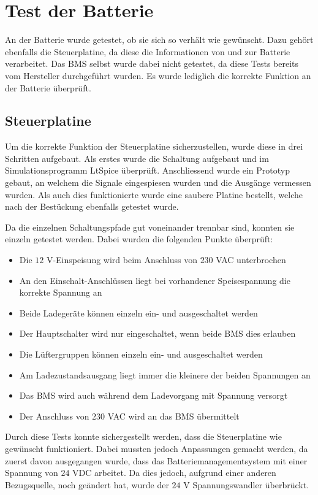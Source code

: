 \section{Test der Batterie}
An der Batterie wurde getestet, ob sie sich so verhält wie gewünscht. Dazu gehört ebenfalls die Steuerplatine, da diese die Informationen von und zur Batterie verarbeitet. Das BMS selbst wurde dabei nicht getestet, da diese Tests bereits vom Hersteller durchgeführt wurden. Es wurde lediglich die korrekte Funktion an der Batterie überprüft.

\subsection{Steuerplatine}
Um die korrekte Funktion der Steuerplatine sicherzustellen, wurde diese in drei Schritten aufgebaut. Als erstes wurde die Schaltung aufgebaut und im Simulationsprogramm LtSpice überprüft. Anschliessend wurde ein Prototyp gebaut, an welchem die Signale eingespiesen wurden und die Ausgänge vermessen wurden. Als auch dies funktionierte wurde eine saubere Platine bestellt, welche nach der Bestückung ebenfalls getestet wurde.

Da die einzelnen Schaltungspfade gut voneinander trennbar sind, konnten sie einzeln getestet werden. Dabei wurden die folgenden Punkte überprüft: \begin{itemize}
	\item Die $12$ V-Einspeisung wird beim Anschluss von $230$ VAC unterbrochen
	\item An den Einschalt-Anschlüssen liegt bei vorhandener Speisespannung die korrekte Spannung an
	\item Beide Ladegeräte können einzeln ein- und ausgeschaltet werden
	\item Der Hauptschalter wird nur eingeschaltet, wenn beide BMS dies erlauben
	\item Die Lüftergruppen können einzeln ein- und ausgeschaltet werden
	\item Am Ladezustandsausgang liegt immer die kleinere der beiden Spannungen an
	\item Das BMS wird auch während dem Ladevorgang mit Spannung versorgt
	\item Der Anschluss von $230$ VAC wird an das BMS übermittelt
\end{itemize}

Durch diese Tests konnte sichergestellt werden, dass die Steuerplatine wie gewünscht funktioniert. Dabei mussten jedoch Anpassungen gemacht werden, da zuerst davon ausgegangen wurde, dass das Batteriemanagementsystem mit einer Spannung von $24$ VDC arbeitet. Da dies jedoch, aufgrund einer anderen Bezugsquelle, noch geändert hat, wurde der $24$ V Spannungswandler überbrückt.

